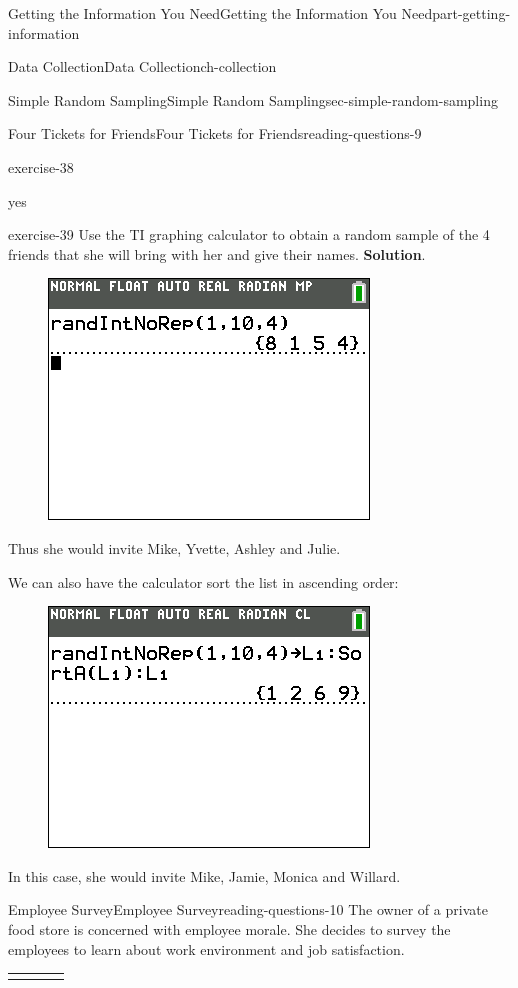 \documentclass[oneside,10pt,]{book}
\numberwithin{equation}{section}
\newcommand{\hrulethick} {\noalign{\hrule height 0.11em}}
\begin{document}
\begin{partptx}{Getting the Information You Need}{}{Getting the Information You Need}{}{}{part-getting-information}
\begin{chapterptx}{Data Collection}{}{Data Collection}{}{}{ch-collection}
\begin{sectionptx}{Simple Random Sampling}{}{Simple Random Sampling}{}{}{sec-simple-random-sampling}
\begin{reading-questions-subsection}{Four Tickets for Friends}{}{Four Tickets for Friends}{}{}{reading-questions-9}
\begin{divisionexercise}{1}{}{}{exercise-38}
\begin{enumerate}[label=(\alph*)]
yes%
\end{enumerate}
\end{divisionexercise}%
\begin{divisionexercise}{2}{}{}{exercise-39}%
Use the TI graphing calculator to obtain a random sample of the 4 friends that she will bring with her and give their names. \textbf{Solution}.\hypertarget{solution-1}{}\quad%
\begin{figure}\centering\includegraphics[width=0.4\linewidth]{images/four-friends.png}
\end{figure}\hypertarget{p-15}{}%
Thus she would invite Mike, Yvette, Ashley and Julie.%
\par
\hypertarget{p-16}{}%
We can also have the calculator sort the list in ascending order:%
\begin{figure}\centering\includegraphics[width=0.4\linewidth]{images/four-friends-sorted.png}
\end{figure}\hypertarget{p-17}{}%
In this case, she would invite Mike, Jamie, Monica and Willard.%
\end{divisionexercise}%
\end{reading-questions-subsection}
%
%
\typeout{************************************************}
\typeout{************************************************}
%
\begin{reading-questions-subsection}{Employee Survey}{}{Employee Survey}{}{}{reading-questions-10}
\hypertarget{p-18}{}%
The owner of a private food store is concerned with employee morale. She decides to survey the employees to learn about work environment and job satisfaction. \begin{tabular}{llll}\hrulethick

\end{tabular}
\end{reading-questions-subsection}
\end{sectionptx}
\end{chapterptx}
\end{partptx}
\end{document}
